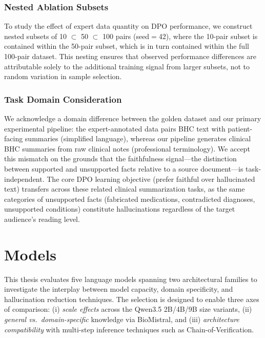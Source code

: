 \documentclass[12pt,a4paper,oneside]{report}
\begin{document}
\subsubsection{Nested Ablation Subsets}

To study the effect of expert data quantity on DPO performance, we construct nested subsets of 10 $\subset$ 50 $\subset$ 100 pairs (seed$=$42), where the 10-pair subset is contained within the 50-pair subset, which is in turn contained within the full 100-pair dataset. This nesting ensures that observed performance differences are attributable solely to the additional training signal from larger subsets, not to random variation in sample selection.

\subsubsection{Task Domain Consideration}

We acknowledge a domain difference between the golden dataset and our primary experimental pipeline: the expert-annotated data pairs BHC text with patient-facing summaries (simplified language), whereas our pipeline generates clinical BHC summaries from raw clinical notes (professional terminology). We accept this mismatch on the grounds that the faithfulness signal---the distinction between supported and unsupported facts relative to a source document---is task-independent. The core DPO learning objective (prefer faithful over hallucinated text) transfers across these related clinical summarization tasks, as the same categories of unsupported facts (fabricated medications, contradicted diagnoses, unsupported conditions) constitute hallucinations regardless of the target audience's reading level.


\section{Models}
\label{sec:models}

This thesis evaluates five language models spanning two architectural families to investigate the interplay between model capacity, domain specificity, and hallucination reduction techniques. The selection is designed to enable three axes of comparison: (i) \textit{scale effects} across the Qwen3.5 2B/4B/9B size variants, (ii) \textit{general vs.\ domain-specific} knowledge via BioMistral, and (iii) \textit{architecture compatibility} with multi-step inference techniques such as Chain-of-Verification.
\end{document}
